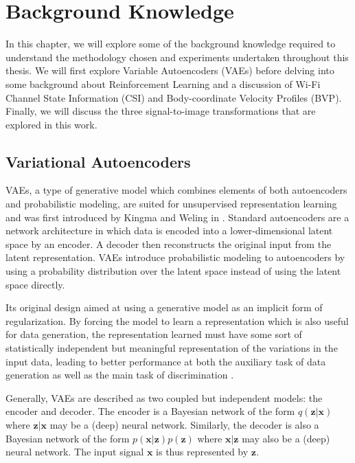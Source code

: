\chapter{Background Knowledge}\label{chapter:background-knowledge}

In this chapter, we will explore some of the background knowledge required to understand the methodology chosen and experiments undertaken throughout this thesis.
We will first explore Variable Autoencoders (VAEs) before delving into some background about Reinforcement Learning and a discussion of Wi-Fi Channel State Information (CSI) and Body-coordinate Velocity Profiles (BVP).
Finally, we will discuss the three signal-to-image transformations that are explored in this work.

\section{Variational Autoencoders}

VAEs, a type of generative model which combines elements of both autoencoders and probabilistic modeling, are suited for unsupervised representation learning and was first introduced by Kingma and Weling in \cite{kingma2013auto}.
Standard autoencoders are a network architecture in which data is encoded into a lower-dimensional latent space by an encoder.
A decoder then reconstructs the original input from the latent representation.
VAEs introduce probabilistic modeling to autoencoders by using a probability distribution over the latent space instead of using the latent space directly.

Its original design aimed at using a generative model as an implicit form of regularization.
By forcing the model to learn a representation which is also useful for data generation, the representation learned must have some sort of statistically independent but meaningful representation of the variations in the input data, leading to better performance at both the auxiliary task of data generation as well as the main task of discrimination \cite{kingma2019introduction}.

Generally, VAEs are described as two coupled but independent models: the encoder and decoder.
The encoder is a Bayesian network of the form $q(\boldsymbol{z} | \boldsymbol{x})$ where $\boldsymbol{z}|\boldsymbol{x}$ may be a (deep) neural network.
Similarly, the decoder is also a Bayesian network of the form $p(\boldsymbol{x}|\boldsymbol{z}) p(\boldsymbol{z})$ where $\boldsymbol{x}|\boldsymbol{z}$ may also be a (deep) neural network.
The input signal $\boldsymbol{x}$ is thus represented by $\boldsymbol{z}$.

